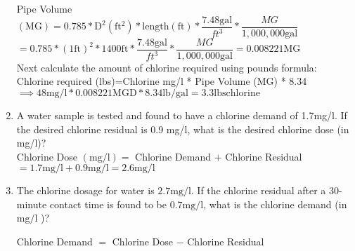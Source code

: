 \begin{enumerate}[1.]
Pipe Volume $(\mathrm{MG})=0.785 * \mathrm{D}^{2} (\mathrm{ft^2}) * \mathrm{length} (\mathrm{ft}) * \dfrac{7.48 \mathrm{gal}}{ft^3}*\dfrac{MG}{1,000,000 \mathrm{gal}}$\\
\vspace{0.2cm}
$= 0.785 *(1 \mathrm{ft})^{2} * 1400 \mathrm{ft} *\dfrac{7.48 \mathrm{gal}}{ft^3}*\dfrac{MG}{1,000,000 \mathrm{gal}}=0.008221 \mathrm{MG}$\\
\vspace{0.2cm}
Next calculate the amount of chlorine required using pounds formula:\\
\vspace{0.2cm}
Chlorine required (lbs)=Chlorine mg/l * Pipe Volume (MG) * 8.34\\
\vspace{0.2cm}
$\implies 48 \mathrm{mg} / \mathrm{l} * 0.008221 \mathrm{MGD} * 8.34 \mathrm{lb} / \mathrm{gal}=\boxed{3.3 \mathrm{lbs chlorine}}$\\
\vspace{0.2cm}
\item A water sample is tested and found to have a chlorine demand of 1.7mg/l. If the desired chlorine residual is 0.9 mg/l, what is the desired chlorine dose (in mg/l)?\\
\vspace{0.2cm}
Chlorine Dose $(\mathrm{mg} / \mathrm{l})=$ Chlorine Demand $+$ Chlorine Residual$=1.7 \mathrm{mg} / \mathrm{l}+0.9 \mathrm{mg} / \mathrm{l}=\boxed{2.6 \mathrm{mg} / \mathrm{l}}$
\vspace{0.2cm}
\item The chlorine dosage for water is $2.7 \mathrm{mg} / \mathrm{l}$. If the chlorine residual after a 30-minute contact time is found to be $0.7 \mathrm{mg} / \mathrm{l}$, what is the chlorine demand (in $\mathrm{mg} / \mathrm{l}$ )?

Chlorine Demand $=$ Chlorine Dose $-$ Chlorine Residual


\end{enumerate}
